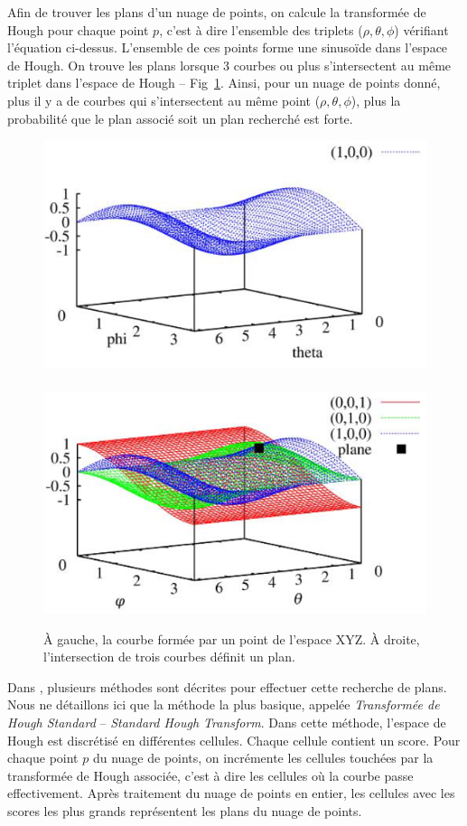 ﻿\documentclass[12pt, twoside]{article}
\begin{document}
Afin de trouver les plans d’un nuage de points, on calcule la transformée de Hough pour chaque point $p$, c’est à dire l’ensemble des triplets ($\rho, \theta, \phi$) vérifiant l’équation ci-dessus. L’ensemble de ces points forme une sinusoïde dans l’espace de Hough. On trouve les plans lorsque 3 courbes ou plus s’intersectent au même triplet dans l’espace de Hough -- Fig~\ref{fig:Hough2}. Ainsi, pour un nuage de points donné, plus il y a de courbes qui s’intersectent au même point ($\rho, \theta, \phi$), plus la probabilité que le plan associé soit un plan recherché est forte.

\begin{figure}[h]
\centering
\includegraphics[scale=0.5]{HoughCurv1.png}~\includegraphics[scale=0.5]{HoughCurv0.png}
\caption{\label{fig:Hough2} À gauche, la courbe formée par un point de l’espace XYZ. À droite, l’intersection de trois courbes définit un plan.}
\end{figure}

Dans \cite{Hough1}, plusieurs méthodes sont décrites pour effectuer cette recherche de plans. Nous ne détaillons ici que la méthode la plus basique, appelée \textit{Transformée de Hough Standard} -- \textit{Standard Hough Transform}. Dans cette méthode, l'espace de Hough est discrétisé en différentes cellules. Chaque cellule contient un score. Pour chaque point $p$ du nuage de points, on incrémente les cellules touchées par la transformée de Hough associée, c'est à dire les cellules où la courbe passe effectivement. Après traitement du nuage de points en entier, les cellules avec les scores les plus grands représentent les plans du nuage de points.
\end{document}
